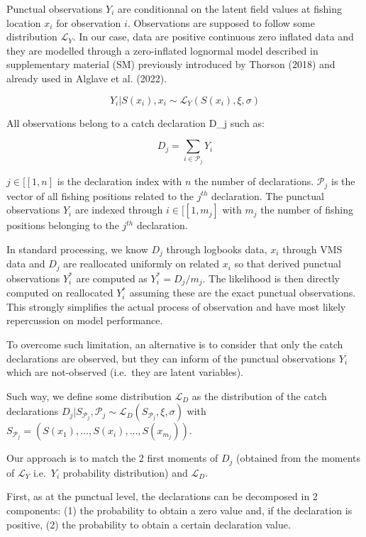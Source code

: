 \documentclass[
  english,
  man]{apa6}
\begin{document}
Punctual observations \(Y_i\) are conditionnal on the latent field values at fishing location \(x_i\) for observation \(i\). Observations are supposed to follow some distribution \(\mathcal{L}_Y\). In our case, data are positive continuous zero inflated data and they are modelled through a zero-inflated lognormal model described in supplementary material (SM) previously introduced by Thorson (2018) and already used in Alglave et al. (2022).

\[Y_i | S(x_i), x_i \sim \mathcal{L}_Y(S(x_i),\xi,\sigma)\]

All observations belong to a catch declaration D\_j such as:

\[D_j=\sum_{i \in \mathcal{P}_j}{Y_{i}}\]

\(j \in [\![1,n]\!\) is the declaration index with \(n\) the number of declarations. \(\mathcal{P}_j\) is the vector of all fishing positions related to the \(j^{th}\) declaration. The punctual observations \(Y_i\) are indexed through \(i \in [\![1,m_j]\!\) with \(m_j\) the number of fishing positions belonging to the \(j^{th}\) declaration.

In standard processing, we know \(D_j\) through logbooks data, \(x_i\) through VMS data and \(D_j\) are reallocated uniformly on related \(x_i\) so that derived punctual observations \(Y^*_i\) are computed as \(Y^*_i=D_j/m_j\). The likelihood is then directly computed on reallocated \(Y^*_i\) assuming these are the exact punctual observations. This strongly simplifies the actual process of observation and have most likely repercussion on model performance.

To overcome such limitation, an alternative is to consider that only the catch declarations are observed, but they can inform of the punctual observations \(Y_i\) which are not-observed (i.e.~they are latent variables).

Such way, we define some distribution \(\mathcal{L}_D\) as the distribution of the catch declarations \(D_j | S_{\mathcal{P}_j},\mathcal{P}_j \sim \mathcal{L}_D( S_{\mathcal{P}_j},\xi,\sigma)\) with \(S_{\mathcal{P}_j}=(S(x_1),...,S(x_i), ...,S(x_{m_j}))\).

Our approach is to match the 2 first moments of \(D_j\) (obtained from the moments of \(\mathcal{L}_Y\) i.e.~\(Y_i\) probability distribution) and \(\mathcal{L}_D\).

First, as at the punctual level, the declarations can be decomposed in 2 components: (1) the probability to obtain a zero value and, if the declaration is positive, (2) the probability to obtain a certain declaration value.
\end{document}
